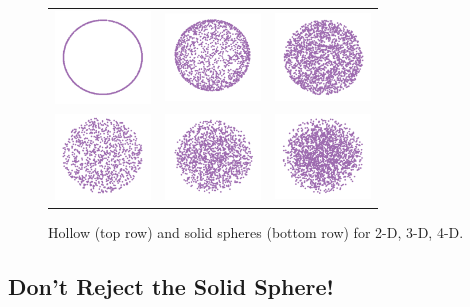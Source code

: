 \documentclass[article]{jss}
\begin{document}
\begin{figure}[ht]
\centering
\begin{tabular}{c c c}
\includegraphics[width=1in]{sphere-2.pdf} 
&\includegraphics[width=1in]{sphere-3.pdf} 
&\includegraphics[width=1in]{sphere-4.pdf}
\\
\includegraphics[width=1in]{sphere-2-solid.pdf} 
&\includegraphics[width=1in]{sphere-3-solid.pdf} 
&\includegraphics[width=1in]{sphere-4-solid.pdf} 
\end{tabular}
\caption{Hollow (top row) and solid spheres (bottom row) for 2-D, 3-D,
  4-D.}
\label{cfb}
\end{figure}

\subsection{Don't Reject the Solid Sphere!}
\end{document}
